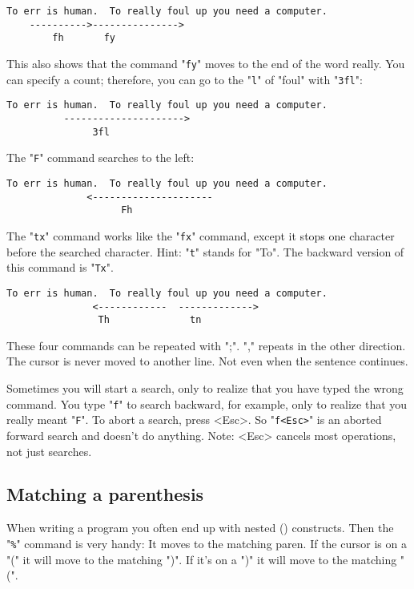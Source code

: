 		\begin{Verbatim}[samepage=true]
    To err is human.  To really foul up you need a computer. 
    ---------->--------------->
        fh       fy
		\end{Verbatim}

This also shows that the command "\texttt{fy}" moves to the end of the word really.
You can specify a count; therefore, you can go to the "\texttt{l}" of "foul" with "\texttt{3fl}":

		\begin{Verbatim}[samepage=true]
    To err is human.  To really foul up you need a computer. 
          --------------------->
               3fl
		\end{Verbatim}

The "\texttt{F}" command searches to the left:

		\begin{Verbatim}[samepage=true]
    To err is human.  To really foul up you need a computer. 
              <---------------------
                    Fh
		\end{Verbatim}

The "\texttt{tx}" command works like the "\texttt{fx}" command, except it stops one character before the searched character.
Hint: "\texttt{t}" stands for "To".
The backward version of this command is "\texttt{Tx}".

		\begin{Verbatim}[samepage=true]
    To err is human.  To really foul up you need a computer. 
               <------------  ------------->
                Th              tn
		\end{Verbatim}

These four commands can be repeated with ";".
"," repeats in the other direction.
The cursor is never moved to another line.
Not even when the sentence continues.

Sometimes you will start a search, only to realize that you have typed the wrong command.
You type "\texttt{f}" to search backward, for example, only to realize that you really meant "\texttt{F}".
To abort a search, press <Esc>.
So "\texttt{f<Esc>}" is an aborted forward search and doesn't do anything.
Note: <Esc> cancels most operations, not just searches.

\subsection{Matching a parenthesis}

When writing a program you often end up with nested () constructs.
Then the "\texttt{\%}" command is very handy: It moves to the matching paren.
If the cursor is on a "(" it will move to the matching ")".
If it's on a ")" it will move to the matching "(".

